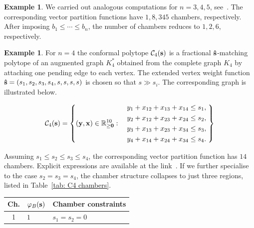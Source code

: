 \documentclass[12pt,a4paper]{extarticle}
\theoremstyle{definition}
\newtheorem{example}[theorem]{Example}
\newcommand{\R}{\mathbb{R}}
\begin{document}
\begin{example}
We carried out analogous computations for $n=3,4,5$, see~\cite{zenodo}.
The corresponding vector partition functions have $1,8,345$ chambers, respectively.
After imposing $b_1\le\cdots\le b_n$, the number of chambers reduces to
$1,2,6$, respectively.
\end{example}
\begin{example}\label{ex: Cs1s2s3s4}
For $n=4$ the conformal polytope $\mathcal{C}_4({\bf s})$ is a fractional
${\bf \hat{s}}$‑matching polytope of an augmented graph $K_4^*$ obtained from the complete graph $K_4$ by attaching one pending edge
to each vertex. The extended vertex weight function
$
{\bf \hat{s}}=(s_1,s_2,s_3,s_4,s,s,s,s)
$
is chosen so that $s\gg s_i$. The corresponding graph is illustrated below.

\smallskip

\begin{minipage}[]{0.35\textwidth}
\begin{center}
\end{center}
\end{minipage}
\begin{minipage}[b]{0.5\textwidth}
$$\mathcal{C}_4({\bf s}) = \left\{({\bf y},{\bf x}) \in \R_{\ge {\bf 0}}^{10} : \quad
\begin{aligned}
y_1+x_{12}+x_{13}+x_{14} &\le s_1,\\
y_2+x_{12}+x_{23}+x_{24} &\le s_2,\\
y_3+x_{13}+x_{23}+x_{34} &\le s_3,\\
y_4+x_{14}+x_{24}+x_{34} &\le s_4.
\end{aligned}\; \right\}
$$
\end{minipage}

\vspace{0.2cm}
\noindent
Assuming $s_1\le s_2\le s_3\le s_4$, the corresponding vector partition function has $14$ chambers. Explicit expressions are available at the link~\cite{zenodo}.
If we further specialise to the case
$
{s_2=s_3=s_4}
$,
the chamber structure collapses to just three regions,
 listed in
Table~\ref{tab: C4 chambers}.
\begin{table}[h]
\centering
\renewcommand{\arraystretch}{1.4}
\small
\begin{tabular}{c p{10cm} p{4cm}}
\hline
\textbf{Ch.} & $\varphi_B({\bf s})$ & \textbf{Chamber constraints} \\
\hline
1 &
$1$ &
$
s_1=s_2=0
$ \\


\end{tabular}
\end{table}
\end{example}
\end{document}
